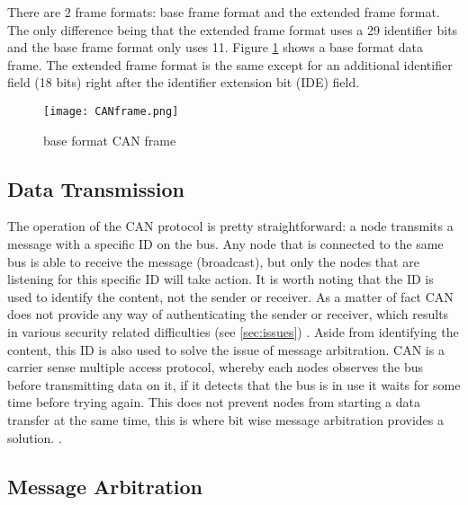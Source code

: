 There are 2 frame formats: base frame format and the extended frame format. The only difference being that the extended frame format uses a 29 identifier bits and the base frame format only uses 11. Figure \ref{fig:CANframe} shows a base format data frame. The extended frame format is the same except for an additional identifier field (18 bits) right after the identifier extension bit (IDE) field. 
\begin{figure}[h]
	\label{fig:CANframe}
	\centering
	\texttt{[image: CANframe.png]}
	\caption{base format CAN frame \cite{Pan}}
\end{figure}

\subsection{Data Transmission}
\label{subsec:can:data_transmission}

The operation of the CAN protocol is pretty straightforward: a node transmits a message with a specific ID on the bus. Any node that is connected to the same bus is able to receive the message (broadcast), but only the nodes that are listening for this specific ID will take action. It is worth noting that the ID is used to identify the content, not the sender or receiver. As a matter of fact CAN does not provide any way of authenticating the sender or receiver, which results in various security related difficulties (see \ref{sec:issues}) . Aside from identifying the content, this ID is also used to solve the issue of message arbitration. CAN is a carrier sense multiple access protocol, whereby each nodes observes the bus before transmitting data on it, if it detects that the bus is in use it waits for some time before trying again. This does not prevent nodes from starting a data transfer at the same time, this is where bit wise message arbitration provides a solution. \cite{CANarbitration}.

\subsection{Message Arbitration}
\label{subsec:can:message_arbitration}


